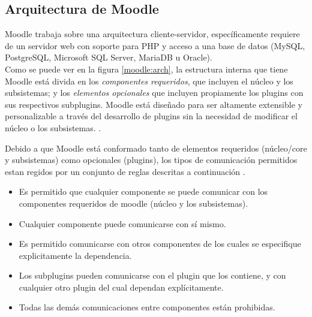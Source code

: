 \subsection{Arquitectura de Moodle}

    Moodle trabaja sobre una arquitectura cliente-servidor, específicamente requiere de un servidor web con soporte para PHP y acceso a una base de datos (MySQL, PostgreSQL, Microsoft SQL Server, MariaDB u Oracle).\\
    
    \noindent Como se puede ver en la figura \ref{moodle:arch}, la estructura interna que tiene Moodle está divida en los {\it componentes requeridos}, que incluyen el núcleo y los subsistemas; y los {\it elementos opcionales} que incluyen propiamente los plugins con sus respectivos subplugins. Moodle está diseñado para ser altamente extensible y personalizable a través del desarrollo de plugins sin la necesidad de modificar el núcleo o los subsistemas. \cite{moodleArch}.
    
    
    \noindent Debido a que Moodle está conformado tanto de elementos requeridos (núcleo/core y subsistemas) como opcionales (plugins), los tipos de comunicación permitidos estan regidos por un conjunto de reglas descritas a continuación \cite{moodleComponets}.
    
    \begin{itemize}
        \item{ Es permitido que cualquier componente se puede comunicar con los componentes requeridos de moodle (núcleo y los subsistemas). }
        \item{ Cualquier componente puede comunicarse con sí mismo. }
        \item { Es permitido comunicarse con otros componentes de los cuales se especifique explicitamente la dependencia. }
        \item {Los subplugins pueden comunicarse con el plugin que los contiene, y con cualquier otro plugin del cual dependan explícitamente.}
        \item {Todas las demás comunicaciones entre componentes están prohibidas.}
    \end{itemize}
    
